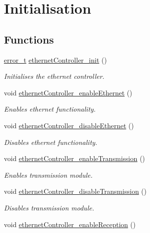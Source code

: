 \hypertarget{group__init}{}\section{Initialisation}
\label{group__init}
\subsection*{Functions}
\begin{DoxyCompactItemize}
\item 
\mbox{\hyperlink{group__error_gad3ae44be85fe6952dcaed425499e8f6b}{error\+\_\+t}} \mbox{\hyperlink{group__init_ga440a9f27fc612a678d3d17eb5983c977}{ethernet\+Controller\+\_\+init}} ()
\begin{DoxyCompactList}\small\item\em Initialises the ethernet controller. \end{DoxyCompactList}\item 
void \mbox{\hyperlink{group__init_ga06ef512fd11e36bbefaad96993875d2b}{ethernet\+Controller\+\_\+enable\+Ethernet}} ()
\begin{DoxyCompactList}\small\item\em Enables ethernet functionality. \end{DoxyCompactList}\item 
void \mbox{\hyperlink{group__init_gaadd13e81fe0097411b3aae2f6810bbe1}{ethernet\+Controller\+\_\+disable\+Ethernet}} ()
\begin{DoxyCompactList}\small\item\em Disables ethernet functionality. \end{DoxyCompactList}\item 
void \mbox{\hyperlink{group__init_ga0aef586bd9434125367071595a794806}{ethernet\+Controller\+\_\+enable\+Transmission}} ()
\begin{DoxyCompactList}\small\item\em Enables transmission module. \end{DoxyCompactList}\item 
void \mbox{\hyperlink{group__init_ga7cb7d48ac9c1a7bd6393c95e6e07dcee}{ethernet\+Controller\+\_\+disable\+Transmission}} ()
\begin{DoxyCompactList}\small\item\em Disables transmission module. \end{DoxyCompactList}\item 
void \mbox{\hyperlink{group__init_ga203eb473ea1d221ffe97839b16e74565}{ethernet\+Controller\+\_\+enable\+Reception}} ()

\end{DoxyCompactItemize}
